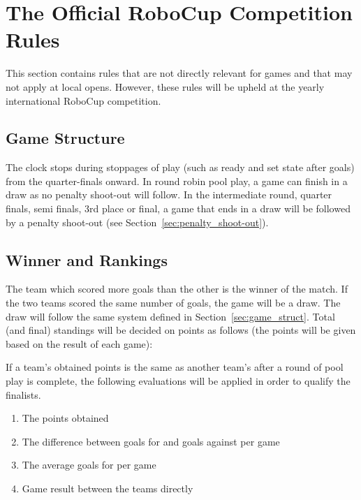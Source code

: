 \documentclass[12pt]{article}
\begin{document}
\newpage


\section{The Official RoboCup Competition Rules}
\label{sec:comRules}
This section contains rules that are not directly relevant for games and that may not apply at local opens.  However, these rules will be upheld at the yearly international RoboCup competition.

\subsection{Game Structure}

The clock stops during stoppages of play (such as ready and set state after goals) from the quarter-finals onward.  In round robin pool play, a game can finish in a draw as no penalty shoot-out will follow. In the intermediate round, quarter finals, semi finals, 3rd place or final, a game that ends in a draw will be followed by a penalty shoot-out (see Section~\ref{sec:penalty_shoot-out}).

\subsection{Winner and Rankings}

The team which scored more goals than the other is the winner of the match. If the two teams scored the same number of goals, the game will be a draw. The draw will follow the same system defined in Section~\ref{sec:game_struct}. Total (and final) standings will be decided on points as follows (the points will be given based on the result of each game):


If a team's obtained points is the same as another team's after a round of pool play is complete, the following evaluations will be applied in order to qualify the finalists.

\begin{enumerate}

\item The points obtained

\item The difference between goals for and goals against per game

\item The average goals for per game

\item Game result between the teams directly

\end{enumerate}
\end{document}
